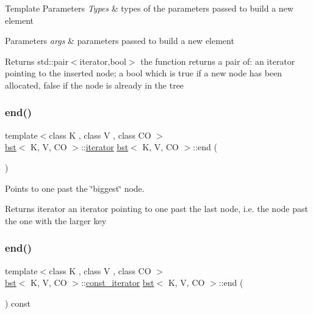 \begin{DoxyTemplParams}{Template Parameters}
{\em Types} & types of the parameters passed to build a new element \\
\hline
\end{DoxyTemplParams}

\begin{DoxyParams}{Parameters}
{\em args} & parameters passed to build a new element \\
\hline
\end{DoxyParams}
\begin{DoxyReturn}{Returns}
std\+::pair$<$iterator,bool$>$ the function returns a pair of\+: an iterator pointing to the inserted node; a bool which is true if a new node has been allocated, false if the node is already in the tree 
\end{DoxyReturn}
\mbox{\label{classbst_ab07e1bc4d1d387578488777858b75934}} 
\subsubsection{\texorpdfstring{end()}{end()}\hspace{0.1cm}{\footnotesize\ttfamily [1/2]}}
{\footnotesize\ttfamily template$<$class K , class V , class CO $>$ \\
\hyperlink{classbst}{bst}$<$ K, V, CO $>$\+::\hyperlink{classbst_a9378fa7f3f48ee62f3a0b4d168d8d98b}{iterator} \hyperlink{classbst}{bst}$<$ K, V, CO $>$\+::end (\begin{DoxyParamCaption}{ }\end{DoxyParamCaption})\hspace{0.3cm}{\ttfamily [noexcept]}}



Points to one past the \char`\"{}biggest\char`\"{} node. 

\begin{DoxyReturn}{Returns}
iterator an iterator pointing to one past the last node, i.\+e. the node past the one with the larger key 
\end{DoxyReturn}
\mbox{\label{classbst_a2c398a1b2cf08de0833d476aaefea7dd}} 
\subsubsection{\texorpdfstring{end()}{end()}\hspace{0.1cm}{\footnotesize\ttfamily [2/2]}}
{\footnotesize\ttfamily template$<$class K , class V , class CO $>$ \\
\hyperlink{classbst}{bst}$<$ K, V, CO $>$\+::\hyperlink{classbst_1_1__iterator}{const\+\_\+iterator} \hyperlink{classbst}{bst}$<$ K, V, CO $>$\+::end (\begin{DoxyParamCaption}{ }\end{DoxyParamCaption}) const\hspace{0.3cm}{\ttfamily [noexcept]}}



